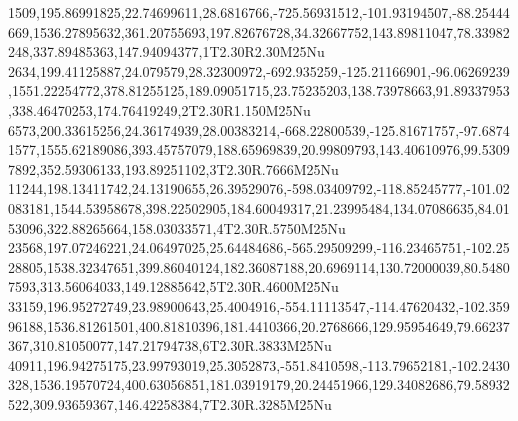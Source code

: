 1509,195.86991825,22.74699611,28.6816766,-725.56931512,-101.93194507,-88.25444669,1536.27895632,361.20755693,197.82676728,34.32667752,143.89811047,78.33982248,337.89485363,147.94094377,1T2.30R2.30M25Nu
2634,199.41125887,24.079579,28.32300972,-692.935259,-125.21166901,-96.06269239,1551.22254772,378.81255125,189.09051715,23.75235203,138.73978663,91.89337953,338.46470253,174.76419249,2T2.30R1.150M25Nu
6573,200.33615256,24.36174939,28.00383214,-668.22800539,-125.81671757,-97.68741577,1555.62189086,393.45757079,188.65969839,20.99809793,143.40610976,99.53097892,352.59306133,193.89251102,3T2.30R.7666M25Nu
11244,198.13411742,24.13190655,26.39529076,-598.03409792,-118.85245777,-101.02083181,1544.53958678,398.22502905,184.60049317,21.23995484,134.07086635,84.0153096,322.88265664,158.03033571,4T2.30R.5750M25Nu
23568,197.07246221,24.06497025,25.64484686,-565.29509299,-116.23465751,-102.2528805,1538.32347651,399.86040124,182.36087188,20.6969114,130.72000039,80.54807593,313.56064033,149.12885642,5T2.30R.4600M25Nu
33159,196.95272749,23.98900643,25.4004916,-554.11113547,-114.47620432,-102.35996188,1536.81261501,400.81810396,181.4410366,20.2768666,129.95954649,79.66237367,310.81050077,147.21794738,6T2.30R.3833M25Nu
40911,196.94275175,23.99793019,25.3052873,-551.8410598,-113.79652181,-102.2430328,1536.19570724,400.63056851,181.03919179,20.24451966,129.34082686,79.58932522,309.93659367,146.42258384,7T2.30R.3285M25Nu
